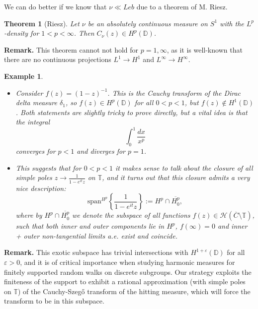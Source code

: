 \documentclass[11pt]{article}
\newtheorem{theorem}{Theorem}[section]
\newtheorem{example}{Example}[section]
\begin{document}
We can do better if we know that $\nu \ll Leb$ due to a theorem of M. Riesz.

\begin{theorem}[Riesz]
	\label{Cauchy of Lp}
	Let $\nu$ be an absolutely continuous measure on $S^1$ with the $L^p$-density for $1 < p < \infty$. Then $C_\nu(z) \in H^p(\mathbb{D})$.
\end{theorem}

\textbf{Remark.} This theorem cannot not hold for $p = 1, \infty$, as it is well-known that there are no continuous projections $L^1 \rightarrow H^1$ and $L^\infty \rightarrow H^{\infty}.$

\begin{example}
	\indent
	\begin{itemize}
		\item 	Consider $f(z) = (1 - z)^{-1}$. This is the Cauchy transform of the Dirac delta measure $\delta_1$, so $f(z) \in H^p(\mathbb{D})$ for all $0 < p < 1$, but $f(z) \notin H^{1}(\mathbb{D})$. Both statements are slightly tricky to prove directly, but a vital idea is that the integral
		\[
		\int_{0}^1 \frac{dx}{x^p}
		\]
		converges for $p < 1$ and diverges for $p = 1$.
		\item This suggests that for $0 < p < 1$ it makes sense to talk about the closure of all simple poles $z \rightarrow \frac{1}{1 - e^{it}z}$ on $\mathbb{T}$, and it turns out that this closure admits a very nice description:
		\begin{equation}
			\text{span}^{H^p} \left\lbrace \frac{1}{1 - e^{it}z} \right\rbrace := H^p \cap \overline{H^p_0},
		\end{equation}
		where by $H^p \cap \overline{H^p_0}$ we denote the subspace of all functions $f(z) \in \mathcal{H}(\overline{C} \setminus \mathbb{T})$, such that both inner and outer components lie in $H^p$, $f(\infty) = 0$ and inner + outer non-tangential limits a.e. exist and coincide. 
		
		
	\end{itemize}
\end{example}
\textbf{Remark.} This exotic subspace has trivial intersections with $H^{1 + \varepsilon}(\mathbb{D})$ for all $\varepsilon > 0$, and it is of critical importance when studying harmonic measures for finitely supported random walks on discrete subgroups. Our strategy exploits the finiteness of the support to exhibit a rational approximation (with simple poles on $\mathbb{T}$) of the Cauchy-Szeg\H{o} transform of the hitting measure, which will force the transform to be in this subspace.
\end{document}
